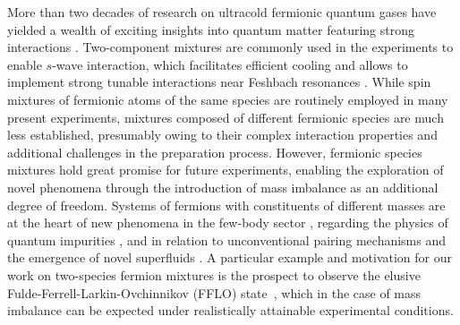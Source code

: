 More than two decades of research on ultracold fermionic quantum gases %
have yielded a wealth of exciting insights into quantum matter featuring strong interactions \cite{Varenna2006book, Varenna2014book, Varenna2022book, Zwerger2012tbb, Strinati2018tbb}. Two-component %
mixtures are commonly used in the experiments to enable $s$-wave interaction, which facilitates efficient cooling and allows to implement strong tunable interactions near Feshbach resonances \cite{Chin2010fri}.
While spin mixtures of fermionic atoms of the same species are routinely employed in many present experiments, mixtures composed of different fermionic species are much less established, presumably owing to their complex interaction properties and additional challenges in the preparation process.
However, fermionic species mixtures hold great promise for future experiments, enabling the exploration of novel phenomena through the introduction of mass imbalance as an additional degree of freedom.
Systems of fermions with constituents of different masses are at the heart of new phenomena in the few-body sector \cite{Efimov1973elo, Kartavtsev2007let, Nishida2008ufg, Blume2010bou, Bazak2017fbe, Mathy2011tma, Levinsen2009ads, Jag2014ooa, Naidon2017epa, Greene2017ufb}, regarding the physics of quantum impurities \cite{Mathy2011tma, Baroni2024mib, Massignan2025pia}, and in relation to unconventional pairing mechanisms \cite{Liu2003igs, Forbes2005scf, Iskin2006tsf, Parish2007pfc, Baranov2008spb, Gezerlis2009hlf, Gubbels2009lpi, Baarsma2013isp, Gubbels2013ifg, Wang2017eeo, Pini2021bmf} and the emergence of novel superfluids \cite{Bennemann2014both, Liu2023qsi}. A particular example and motivation for our {work on two-species fermion mixtures} is the prospect to observe the elusive Fulde-Ferrell-Larkin-Ovchinnikov (FFLO) state~\cite{Fulde1964sia,Larkin1964nss,Radzihovsky2010ifr}, which in 
{the case of mass imbalance} can be expected \cite{Gubbels2009lpi, Baarsma2013isp, Gubbels2013ifg, Wang2017eeo, Pini2021bmf} under realistically attainable experimental conditions.

